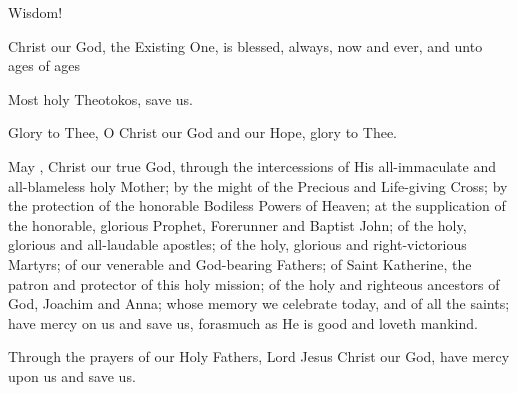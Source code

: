 \documentclass[twoside, letterpaper, 12pt]{report}
\begin{document}
\vbox{}
\cleardoublepage


\begin{deacon}
\item Wisdom!
\end{deacon}

\begin{priest}
\item Christ our God, the Existing One, is blessed, always, now and ever,
    and unto ages of ages
\end{priest}

\begin{priest}
\item Most holy Theotokos, save us.
\end{priest}

\begin{priest}
\item Glory to Thee, O Christ our God and our Hope, glory to Thee.
\end{priest}

\begin{priest}
\item May , Christ our true God, through the intercessions of His
    all-immaculate and all-blameless holy Mother; by the might of the Precious and Life-giving Cross;
    by the protection of the honorable Bodiless Powers of Heaven;
    at the supplication of the honorable, glorious Prophet, Forerunner and Baptist John;
    of the holy, glorious and all-laudable apostles;
    of the holy, glorious and right-victorious Martyrs;
    of our venerable and God-bearing Fathers;
    of Saint Katherine, the patron and protector of this holy mission;
    of the holy and righteous ancestors of God, Joachim and Anna;
     whose memory we celebrate today,
    and of all the saints;
    have mercy on us and save us, forasmuch as He is good and loveth mankind.
\item Through the prayers of our Holy Fathers, Lord Jesus Christ our God,
    have mercy upon us and save us.
\end{priest}
\end{document}
